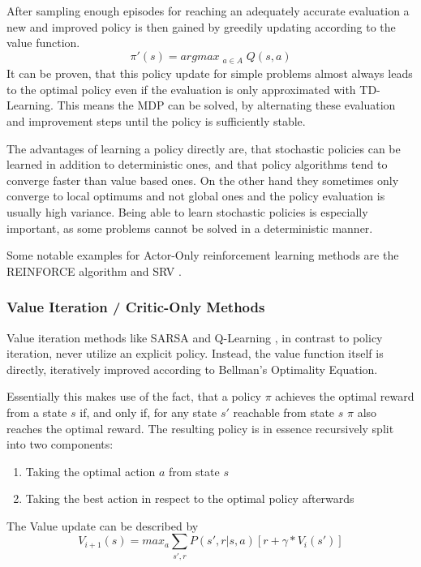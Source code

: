 After sampling enough episodes for reaching an adequately accurate evaluation a new and improved policy is then gained by greedily updating according to the value function.
$$\pi'(s) = argmax_{\substack{a \in A}} Q(s,a)$$
It can be proven, that this policy update for simple problems almost always leads to the optimal policy even if the evaluation is only approximated with TD-Learning. This means the MDP can be solved, by alternating these evaluation and improvement steps until the policy is sufficiently stable.

The advantages of learning a policy directly are, that stochastic policies can be learned in addition to deterministic ones, and that policy algorithms tend to converge faster than value based ones. On the other hand they sometimes only converge to local optimums and not global ones and the policy evaluation is usually high variance. Being able to learn stochastic policies is especially important, as some problems cannot be solved in a deterministic manner.

Some notable examples for Actor-Only reinforcement learning methods are the REINFORCE algorithm \citep{DBLP:journals/ml/Williams92} and SRV \citep{DBLP:journals/nn/Gullapalli90}.

\subsubsection{Value Iteration / Critic-Only Methods}
\label{sec:vallearning}
Value iteration methods like SARSA\citep{Rummery94on-lineq-learning} and Q-Learning \citep{DBLP:journals/ml/WatkinsD92}, in contrast to policy iteration, never utilize an explicit policy. Instead, the value function itself is directly, iteratively improved according to Bellman's Optimality Equation.

Essentially this makes use of the fact, that a policy $\pi$ achieves the optimal reward from a state $s$ if, and only if, for any state $s'$ reachable from state $s$ $\pi$ also reaches the optimal reward. The resulting policy is in essence recursively split into two components: 
\begin{enumerate}
\item Taking the optimal action $a$ from state $s$
\item Taking the best action in respect to the optimal policy afterwards
\end{enumerate}

The Value update can be described by 
$$V_{i+1}(s) = max_a \sum_{s',r} P(s', r | s, a) [r + \gamma* V_i(s')]$$

